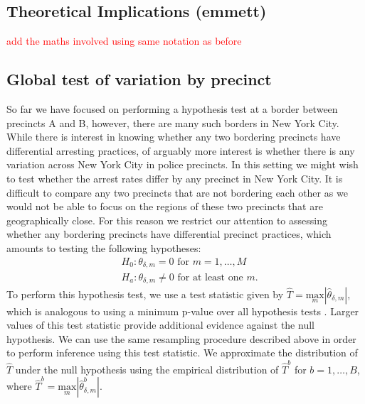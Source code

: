 \documentclass[a4paper,11pt]{article}
\begin{document}
\subsection{Theoretical Implications (emmett)}
\label{sec:theory}
\textcolor{red}{add the maths involved using same notation as before}

\subsection{Global test of variation by precinct}
\label{sec:Global}

So far we have focused on performing a hypothesis test at a border between precincts A and B, however, there are many such borders in New York City. While there is interest in knowing whether any two bordering precincts have differential arresting practices, of arguably more interest is whether there is any variation across New York City in police precincts. In this setting we might wish to test whether the arrest rates differ by any precinct in New York City. It is difficult to compare any two precincts that are not bordering each other as we would not be able to focus on the regions of these two precincts that are geographically close. For this reason we restrict our attention to assessing whether any bordering precincts have differential precinct practices, which amounts to testing the following hypotheses:
\begin{align*}
    & H_0: \theta_{\delta, m} = 0 \text{ for } m=1, \dots, M \\
    & H_a: \theta_{\delta, m} \neq 0 \text{ for at least one } m.
\end{align*}
To perform this hypothesis test, we use a test statistic given by $\widehat{T} = \underset{m}{\text{max}} |\widehat{\theta}_{\delta, m}|$, which is analogous to using a minimum p-value over all hypothesis tests \citep{tippett1931methods}. Larger values of this test statistic provide additional evidence against the null hypothesis. We can use the same resampling procedure described above in order to perform inference using this test statistic. We approximate the distribution of $\widehat{T}$ under the null hypothesis using the empirical distribution of $\widehat{T}^b$ for $b=1, \dots, B$, where $\widehat{T}^b = \underset{m}{\text{max}} |\widehat{\theta}_{\delta, m}^b|$. 
\end{document}

